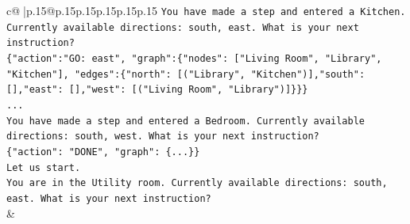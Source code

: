 \documentclass{article}
\begin{document}
{\begin{supertabular}{c@{$\;$}|p{.15\linewidth}@{}p{.15\linewidth}p{.15\linewidth}p{.15\linewidth}p{.15\linewidth}p{.15\linewidth}}
{{{\texttt{You have made a step and entered a Kitchen. Currently available directions: south, east. What is your next instruction?} \\
\texttt{\{"action":"GO: east", "graph":\{"nodes": {[}"Living Room", "Library", "Kitchen"{]}, "edges":\{"north": {[}("Library", "Kitchen"){]},"south": {[}{]},"east": {[}{]},"west": {[}("Living Room", "Library"){]}\}\}\}} \\
\texttt{...} \\
\texttt{You have made a step and entered a Bedroom. Currently available directions: south, west. What is your next instruction?} \\
\texttt{\{"action": "DONE", "graph": \{...\}\}} \\
\texttt{Let us start.} \\
\texttt{You are in the Utility room. Currently available directions: south, east. What is your next instruction?} \\
            }
        }
    }
    & \\ \\


\end{supertabular}}
\end{document}
